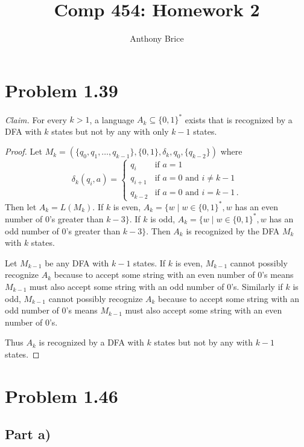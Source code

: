 \documentclass{abrice}
\title{Comp 454: Homework 2}
\author{Anthony Brice}
\begin{document}
\maketitle

\section{Problem 1.39}

\emph{Claim.} For every $k > 1$, a language $A_k \subseteq {\{0,1\}}^*$ exists
that is recognized by a DFA with $k$ states but not by any with only $k - 1$
states.

\begin{proof}
  Let $M_k = (\{q_0, q_1, \ldots, q_{k-1}\}, \{0,1\}, \delta_k, q_0,
  \{q_{k-2}\})$ where
  \[
    \delta_k(q_i,a) =
    \begin{cases}
      q_i & \text{if } a = 1 \\
      q_{i + 1} & \text{if } a = 0 \text{ and } i \neq k - 1
      \\
      q_{k - 2} & \text{if } a = 0 \text{ and } i  = k -1\, .
    \end{cases}
  \]
  Then let $A_k = L(M_k)$. If $k$ is even, $A_k = \{ w \mid w \in {\{0,1\}}^*, w
  $ has an even number of $0$'s greater than $k - 3\}$. If $k$ is odd, $A_k = \{
  w \mid w \in {\{0,1\}}^*, w$ has an odd number of $0$'s greater than $k -
  3\}$. Then $A_k$ is recognized by the DFA $M_k$ with $k$ states.

  Let $M_{k - 1}$ be any DFA with $k - 1$ states. If $k$ is even, $M_{k - 1}$
  cannot possibly recognize $A_k$ because to accept some string with an even
  number of $0$'s means $M_{k-1}$ must also accept some string with an odd number
  of $0$'s. Similarly if $k$ is odd, $M_{k-1}$ cannot possibly recognize $A_k$
  because to accept some string with an odd number of $0$'s means $M_{k-1}$
  must also accept some string with an even number of $0$'s.

  Thus $A_k$ is recognized by a DFA with $k$ states but not by any with $k - 1$
  states.
\end{proof}

\section{Problem 1.46}

\subsection{Part a)}
\end{document}
